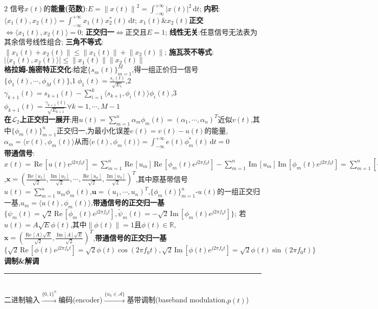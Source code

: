 \documentclass[UTF8,a4paper,10pt]{article}
\providecommand{\abs}[1]{\left\lvert#1\right\rvert}
\providecommand{\norm}[1]{\left\lVert#1\right\rVert}
\providecommand{\re}{\,\mathrm{Re}\,}
\providecommand{\im}{\,\mathrm{Im}\,}
\begin{document}
\begin{multicols*}{2}
信号$x(t)$的\textbf{能量(范数)}:$E=\norm{x(t)}^2=\int_{-\infty}^{+\infty}\abs{x(t)}^2\,\mathrm{d}t$;%
    \textbf{内积}:$\langle x_1(t),x_2(t)\rangle=\int_{-\infty}^{+\infty}x_1(t)x_2^*(t)\,\mathrm{d}t$;%
    $x_1(t)$\&$x_2(t)$\textbf{正交}$\Leftrightarrow\langle x_1(t),x_2(t)\rangle=0$;%
    \textbf{正交归一}$\Leftrightarrow$正交且$E=1$;%
    \textbf{线性无关}:任意信号无法表为其余信号线性组合;%
    \textbf{三角不等式}:$\norm{x_1(t)+x_2(t)}\leq\norm{x_1(t)}+\norm{x_2(t)}$;%
    \textbf{施瓦茨不等式}:$\abs{\langle x_1(t),x_2(t)\rangle}\leq\norm{x_1(t)}\norm{x_2(t)}$\\
\textbf{格拉姆-施密特正交化}:给定$\{s_m(t)\}_{m=1}^M$,得一组正价归一信号$\{\phi_1(t),\cdots,\phi_M(t)\}$,\textcircled{1}$\phi_1(t)=\frac{s_1(t)}{\sqrt{E_1}}$,\textcircled{2}$\gamma_{k+1}(t)=s_{k+1}(t)-\sum_{i=1}^k\langle s_{k+1},\phi_i(t)\rangle\phi_i(t)$,\textcircled{3}$\phi_{k+1}(t)=\frac{\gamma_{k+1}(t)}{\sqrt{E_{k+1}}}\forall k=1,\cdots,M-1$\\
\textbf{在$\mathcal{L}_2$上正交归一展开}:用$u(t)=\sum_{m=1}^n\alpha_m\phi_m(t)=(\alpha_1,\cdots,\alpha_n)^T$近似$v(t)$,其中$\{\phi_m(t)\}_{m=1}^n$正交归一,为最小化误差$e(t)=v(t)-u(t)$的能量,$\alpha_m=\langle v(t),\phi_m(t)\rangle$从而$\langle e(t),\phi_m(t)\rangle=\int_{-\infty}^{+\infty}e(t)\phi_m^*(t)\,\mathrm{d}t=0$\\
\textbf{带通信号}:$x(t)=\re[u(t)e^{j2\pi f_0t}]=\sum_{m=1}^n\re[u_m]\re[\phi_m(t)e^{j2\pi f_0t}]-\sum_{m=1}^n\im[u_m]\im[\phi_m(t)e^{j2\pi f_0t}]=\sum_{m=1}^n[\frac{\re[u_m]}{\sqrt{2}}\psi_m(t)+\frac{\im[u_m]}{\sqrt{2}}\tilde{\psi}_m(t)]$,$\bm{x}=(\frac{\re[u_1]}{\sqrt{2}},\frac{\im[u_1]}{\sqrt{2}},\cdots,\frac{\re[u_n]}{\sqrt{2}},\frac{\im[u_n]}{\sqrt{2}})^T$,其中原基带信号$u(t)=\sum_{m=1}^nu_m\phi_m(t)$,$\bm{u}=(u_1,\cdots,u_n)^T$,$\{\phi_m(t)\}_{m=1}^n$-$u(t)$的一组正交归一基,$u_m=\langle u(t),\phi_m(t)\rangle$,\textbf{带通信号的正交归一基}$\{\psi_m(t)=\sqrt{2}\re[\phi_m(t)e^{j2\pi f_0t}],\tilde{\psi}_m(t)=-\sqrt{2}\im[\phi_m(t)e^{j2\pi f_0t}]\}$;
    若$u(t)=A\sqrt{E}\phi(t)$,其中$\norm{\phi(t)}=1$且$\phi(t)\in\mathbb{R}$,$\bm{x}=(\frac{\re[A]\sqrt{E}}{\sqrt{2}},\frac{\im[A]\sqrt{E}}{\sqrt{2}})^T$,\textbf{带通信号的正交归一基}$\{\sqrt{2}\re[\phi(t)e^{j2\pi f_0t}]=\sqrt{2}\phi(t)\cos(2\pi f_0t),\sqrt{2}\im[\phi(t)e^{j2\pi f_0t}]=\sqrt{2}\phi(t)\sin(2\pi f_0t)\}$\\
\textbf{调制\&解调}\rule{\columnwidth-}{.2pt}\\
二进制输入$\overset{\{0,1\}^n}{\rightarrow}$编码(encoder)$\overset{\{u_k\in\mathcal{A}\}}{\rightarrow}$基带调制(baseband modulation,$p(t)$)\\

\end{multicols*}
\end{document}
